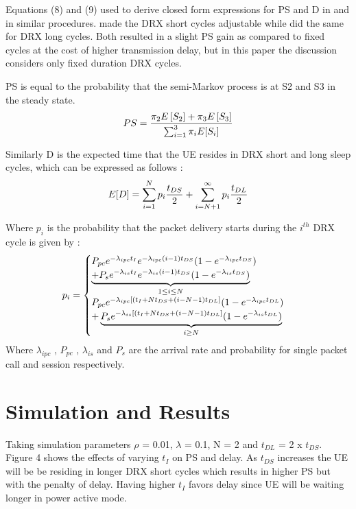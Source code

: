 \documentclass[8pt]{article}
\begin{document}
Equations (8) and (9)  used to derive closed form expressions for 	PS and D in \cite{6363708} and \cite{1690890893} in similar procedures. \cite{6363708} made the DRX short cycles adjustable while \cite{1690890893} did the same for DRX long cycles. Both resulted in a slight PS gain as compared to fixed cycles at the cost of higher transmission delay, but in this paper the discussion considers only fixed duration DRX cycles.

PS is equal to the probability that the semi-Markov process is at S2 and S3 in the steady state.
\begin{equation}
	PS={\pi_{2}E\left[S_{2}\right]+\pi_{3}E\left[S_{3}\right]\over \sum\nolimits_{i=1}^{3}\pi_{i}E[S_{i}]}
\end{equation}

Similarly D is the expected time that the UE resides in DRX short and long sleep cycles, which can be expressed as follows :
\begin{equation}
	E[D]=\sum_{i=1}^{N}p_{i}{t_{DS}\over 2}+\sum_{i=N+1}^{\infty}p_{i}{t_{DL}\over 2}
\end{equation} 

Where \(p_{i}\) is the probability that the packet delivery starts during the \(i^{th}\) DRX cycle is given by :
\begin{equation}
	p_{i}=\begin{cases} P_{pc}e^{-\lambda _{ipc}t_{I}}e^{-\lambda _{ipc}(i-1)t_{DS}}(1-e^{-\lambda _{ipc}t_{DS}})\cr \underbrace{+P_{s}e^{-\lambda _{is}t_{I}}e^{-\lambda _{is}(i-1)t_{DS}}(1-e^{-\lambda _{is}{t_{DS}}})}_{1\leq i\leq N}\cr P_{pc}e^{-\lambda _{ipc}[(t_{I}+Nt_{DS}+(i-N-1)t_{DL}]}(1-e^{-\lambda _{ipc}{t_{DL}}})\cr +\underbrace{ P_{s}e^{-\lambda _{is}[(t_{I}+Nt_{DS}+(i-N-1)t_{DL}]}(1-e^{-\lambda _{is}{t_{DL}}})}_{i\geq N}	
\end{cases}
\end{equation} 
Where \(\lambda _{ipc}\) , \(P_{pc}\) , \(\lambda _{is}\) and \(P_{s}\) are the arrival rate and probability for single packet call and session respectively.
\section*{Simulation and Results}

Taking simulation parameters \(\rho\) = 0.01, \(\lambda\) = 0.1, N = 2 and \(t_{DL}\) = 2 x \(t_{DS}\). Figure 4 shows the effects of varying \(t_{I}\) on PS and delay. As \(t_{DS}\) increases the UE will be be residing in longer DRX short cycles which results in higher PS but with the penalty of delay. Having higher \(t_{I}\) favors delay since UE will be waiting longer in power active mode.
\end{document}
